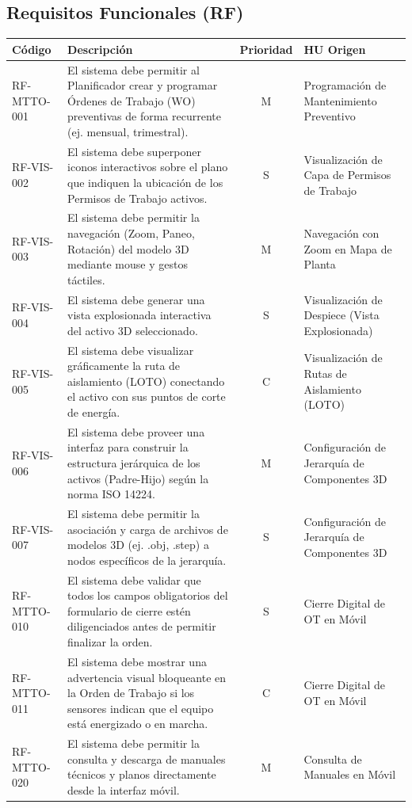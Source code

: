 \subsection{Requisitos Funcionales (RF)}
\footnotesize
\begin{longtable}{|p{2.2cm}|p{8.5cm}|c|p{3.5cm}|}
\hline
\textbf{Código} & \textbf{Descripción} & \textbf{Prioridad} & \textbf{HU Origen} \\ \hline
\endhead
RF-MTTO-001 & El sistema debe permitir al Planificador crear y programar Órdenes de Trabajo (WO) preventivas de forma recurrente (ej. mensual, trimestral). & M & Programación de Mantenimiento Preventivo \\ \hline
RF-VIS-002 & El sistema debe superponer iconos interactivos sobre el plano que indiquen la ubicación de los Permisos de Trabajo activos. & S & Visualización de Capa de Permisos de Trabajo \\ \hline
RF-VIS-003 & El sistema debe permitir la navegación (Zoom, Paneo, Rotación) del modelo 3D mediante mouse y gestos táctiles. & M & Navegación con Zoom en Mapa de Planta \\ \hline
RF-VIS-004 & El sistema debe generar una vista explosionada interactiva del activo 3D seleccionado. & S & Visualización de Despiece (Vista Explosionada) \\ \hline
RF-VIS-005 & El sistema debe visualizar gráficamente la ruta de aislamiento (LOTO) conectando el activo con sus puntos de corte de energía. & C & Visualización de Rutas de Aislamiento (LOTO) \\ \hline
RF-VIS-006 & El sistema debe proveer una interfaz para construir la estructura jerárquica de los activos (Padre-Hijo) según la norma ISO 14224. & M & Configuración de Jerarquía de Componentes 3D \\ \hline
RF-VIS-007 & El sistema debe permitir la asociación y carga de archivos de modelos 3D (ej. .obj, .step) a nodos específicos de la jerarquía. & S & Configuración de Jerarquía de Componentes 3D \\ \hline
RF-MTTO-010 & El sistema debe validar que todos los campos obligatorios del formulario de cierre estén diligenciados antes de permitir finalizar la orden. & S & Cierre Digital de OT en Móvil \\ \hline
RF-MTTO-011 & El sistema debe mostrar una advertencia visual bloqueante en la Orden de Trabajo si los sensores indican que el equipo está energizado o en marcha. & C & Cierre Digital de OT en Móvil \\ \hline
RF-MTTO-020 & El sistema debe permitir la consulta y descarga de manuales técnicos y planos directamente desde la interfaz móvil. & M & Consulta de Manuales en Móvil \\ \hline

\end{longtable}
